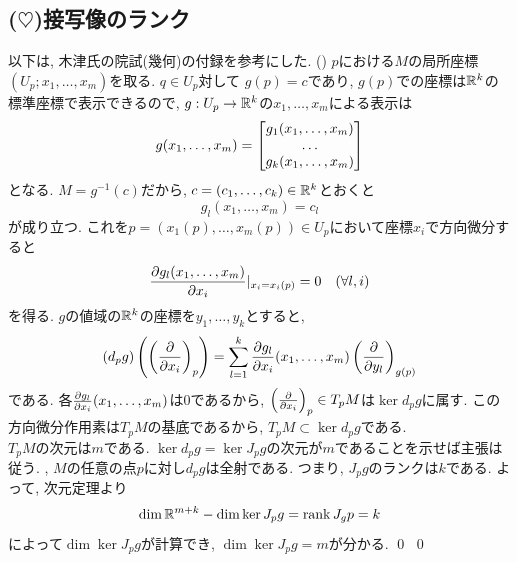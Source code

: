 \subsection{($\heartsuit$)接写像のランク}
以下は, 木津氏の院試(幾何)の付録を参考にした.
\prf
{} ()  $p$における$M$の局所座標$(U_p;x_1,\dots, x_m)$を取る. $q\in U_p$対して $g(p) = c$であり, $g(p)$での座標は$\mathbb{R}^k$の標準座標で表示できるので, $g:U_p\to \mathbb{R}^k$の$x_1,\dots, x_m$による表示は
\[g(x_1,\dots, x_m) = \begin{bmatrix} g_1(x_1,\dots, x_m) \\ \dots \\ g_k(x_1,\dots, x_m) \end{bmatrix}\]
となる. $M=g^{-1}(c)$だから, $c=(c_1,\dots, c_k)\in \mathbb{R}^k$とおくと
\[g_l(x_1,\dots, x_m) = c_l\]
が成り立つ. これを$p=(x_1(p),\dots, x_m(p))\in U_p$において座標$x_i$で方向微分すると
\[\dfrac{\partial g_l(x_1,\dots ,x_m)}{\partial x_i}|_{x_i = x_i(p)}= 0\quad (\forall l,i)\]
を得る. $g$の値域の$\mathbb{R}^k$の座標を$y_1,\dots, y_k$とすると,
\[(d_{p} g)\left( \left( \dfrac{\partial}{\partial x_i} \right)_{p} \right) = \sum_{l=1}^{k}\dfrac{\partial g_l}{\partial x_i}(x_1,\dots, x_m) \left( \dfrac{\partial}{\partial y_l} \right)_{g(p)}\]
である. 各$\frac{\partial g_l}{\partial x_i}(x_1,\dots, x_m)$は$0$であるから,  $\left( \frac{\partial}{\partial x_i} \right)_{p} \in T_{p}M$は$\ker{d_{p}g}$に属す. この方向微分作用素は$T_{p}M$の基底であるから, $T_{p}M\subset \ker{d_{p}g}$である. \\
 $T_{p}M$の次元は$m$である. $\ker{d_{p} g} = \ker{J_{p}g}$の次元が$m$であることを示せば主張は従う. , $M$の任意の点$p$に対し$d_{p}g$は全射である. つまり, $J_{p}g$のランクは$k$である. よって, 次元定理より
\[\dim{\mathbb{R}^{m+k}} - \dim{\ker{J_{p}g}} = \mathrm{rank}\, J_{g}p = k\]
によって$\dim{\ker{J_{p}g}}$が計算でき, $\dim{\ker{J_{p}g}} = m$が分かる. \qed
\qed

